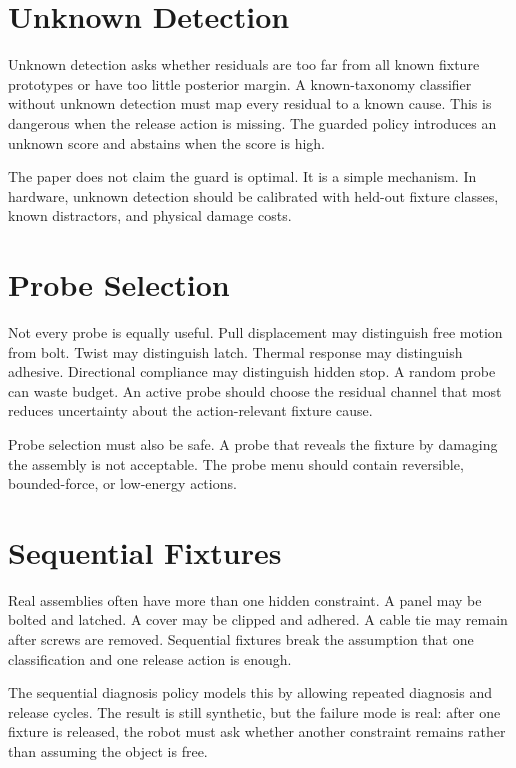 \documentclass{article}
\begin{document}
\section{Unknown Detection}

Unknown detection asks whether residuals are too far from all known fixture
prototypes or have too little posterior margin. A known-taxonomy classifier
without unknown detection must map every residual to a known cause. This is
dangerous when the release action is missing. The guarded policy introduces an
unknown score and abstains when the score is high.

The paper does not claim the guard is optimal. It is a simple mechanism. In
hardware, unknown detection should be calibrated with held-out fixture classes,
known distractors, and physical damage costs.

\section{Probe Selection}

Not every probe is equally useful. Pull displacement may distinguish free
motion from bolt. Twist may distinguish latch. Thermal response may distinguish
adhesive. Directional compliance may distinguish hidden stop. A random probe
can waste budget. An active probe should choose the residual channel that most
reduces uncertainty about the action-relevant fixture cause.

Probe selection must also be safe. A probe that reveals the fixture by damaging
the assembly is not acceptable. The probe menu should contain reversible,
bounded-force, or low-energy actions.

\section{Sequential Fixtures}

Real assemblies often have more than one hidden constraint. A panel may be
bolted and latched. A cover may be clipped and adhered. A cable tie may remain
after screws are removed. Sequential fixtures break the assumption that one
classification and one release action is enough.

The sequential diagnosis policy models this by allowing repeated diagnosis and
release cycles. The result is still synthetic, but the failure mode is real:
after one fixture is released, the robot must ask whether another constraint
remains rather than assuming the object is free.
\end{document}
